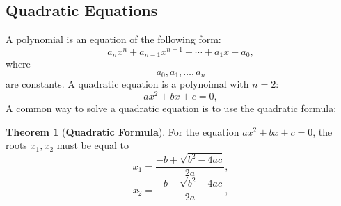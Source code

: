 \documentclass[a4paper]{article}
\theoremstyle{definition}
\newtheorem{theorem}{Theorem}
\begin{document}
\subsection{Quadratic Equations}
A polynomial is an equation of the following form:
\[
    a_n x^n + a_{n-1} x^{n-1} + \cdots + a_1 x + a_0 ,
\]
where
\[
    a_0, a_1, \dots, a_n
\]
are constants. A quadratic equation is a polynoimal with \(n = 2\):
\[
    ax^2 + bx + c = 0,
\]
A common way to solve a quadratic equation is to use the quadratic formula:
\begin{theorem}[\textbf{Quadratic Formula}]
    For the equation \(ax^2 + bx + c = 0\), the roots \(x_1, x_2 \) must be equal to
    \[
        x_1 = \dfrac{-b + \sqrt{b^2 - 4ac}}{2a},
    \]
    \[
        x_2 = \dfrac{-b - \sqrt{b^2 - 4ac}}{2a},
    \]
\end{theorem}
\end{document}
